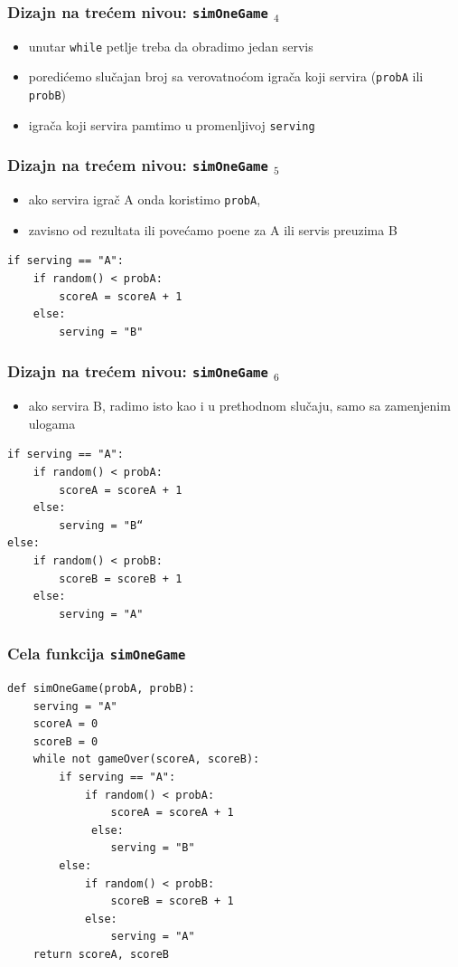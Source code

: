 \documentclass[utf8,compress,aspectratio=169]{beamer}
\begin{document}
\begin{frame}[fragile]
  \frametitle{Dizajn na trećem nivou: \texttt{simOneGame} $_4$}
\begin{itemize}
  \item unutar \texttt{while} petlje treba da obradimo jedan servis
  \item poredićemo slučajan broj sa verovatnoćom igrača koji servira (\texttt{probA} ili \texttt{probB})
  \item igrača koji servira pamtimo u promenljivoj \texttt{serving}
\end{itemize}
\end{frame}

\begin{frame}[fragile]
  \frametitle{Dizajn na trećem nivou: \texttt{simOneGame} $_5$}
\begin{itemize}
  \item ako servira igrač A onda koristimo \texttt{probA},
  \item zavisno od rezultata ili povećamo poene za A ili servis preuzima B
\end{itemize}
\begin{verbatim}
if serving == "A":
    if random() < probA:
        scoreA = scoreA + 1
    else:
        serving = "B"
\end{verbatim}
\end{frame}

\begin{frame}[fragile]
  \frametitle{Dizajn na trećem nivou: \texttt{simOneGame} $_6$}
\begin{itemize}
  \item ako servira B, radimo isto kao i u prethodnom slučaju, samo sa zamenjenim ulogama
\end{itemize}
\begin{verbatim}
if serving == "A":
    if random() < probA:
        scoreA = scoreA + 1
    else:
        serving = "B“
else:
    if random() < probB:
        scoreB = scoreB + 1
    else:
        serving = "A"
\end{verbatim}
\end{frame}

\begin{frame}[fragile,shrink=5]
  \frametitle{Cela funkcija \texttt{simOneGame}}
\begin{verbatim}
def simOneGame(probA, probB):
    serving = "A"
    scoreA = 0
    scoreB = 0
    while not gameOver(scoreA, scoreB):
        if serving == "A":
            if random() < probA:
                scoreA = scoreA + 1
             else:
                serving = "B"
        else:
            if random() < probB:
                scoreB = scoreB + 1
            else:
                serving = "A"
    return scoreA, scoreB
\end{verbatim}
\end{frame}
\end{document}

